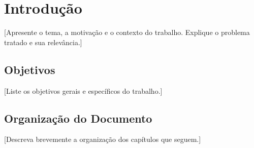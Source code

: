 \section{Introdução}

[Apresente o tema, a motivação e o contexto do trabalho. Explique o problema tratado e sua relevância.]

\subsection{Objetivos}
[Liste os objetivos gerais e específicos do trabalho.]

\subsection{Organização do Documento}
[Descreva brevemente a organização dos capítulos que seguem.]
